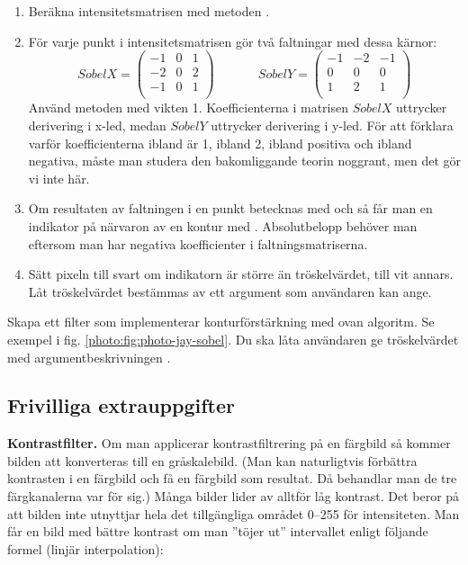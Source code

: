 \begin{enumerate}
	\item Beräkna intensitetsmatrisen med metoden .
	\item För varje punkt i intensitetsmatrisen gör två faltningar med dessa kärnor:
$$
SobelX =
\begin{pmatrix}
  -1 & 0 & 1 \\
  -2 & 0 & 2 \\
  -1 & 0 & 1 \\
\end{pmatrix}
~\hspace{3em}~
SobelY =
\begin{pmatrix}
  -1 & -2 & -1 \\
  0 & 0 & 0 \\
  1 & 2 & 1 \\
\end{pmatrix}
$$
	Använd metoden  med vikten 1. Koefficienterna i matrisen $SobelX$ uttrycker derivering i x-led, medan $SobelY$ uttrycker derivering i y-led. För att förklara varför koefficienterna ibland är 1, ibland 2, ibland positiva och ibland negativa, måste man studera den bakomliggande teorin noggrant, men det gör vi inte här.
	\item Om resultaten av faltningen i en punkt betecknas med  och  så får man en indikator på närvaron av en kontur med . Absolutbelopp behöver man eftersom man har negativa koefficienter i faltningsmatriserna.
	\item  Sätt pixeln till svart om indikatorn är större än tröskelvärdet, till vit annars. Låt tröskelvärdet bestämmas av ett argument som användaren kan ange.
\end{enumerate}
\noindent Skapa ett filter  som implementerar konturförstärkning med ovan algoritm. Se exempel i fig. \ref{photo:fig:photo-jay-sobel}. Du ska låta användaren ge tröskelvärdet med argumentbeskrivningen .


\Task 

\subsection{Frivilliga extrauppgifter}

\Task \textbf{Kontrastfilter.} Om man applicerar kontrastfiltrering på en färgbild så kommer bilden att konverteras till en gråskalebild. (Man kan naturligtvis förbättra kontrasten i en färgbild och få en färgbild som resultat. Då behandlar man de tre färgkanalerna var för sig.) Många bilder lider av alltför låg kontrast. Det beror på att bilden inte utnyttjar hela det tillgängliga området 0–255 för intensiteten. Man får en bild med bättre kontrast om man ''töjer ut'' intervallet enligt följande formel (linjär interpolation):

